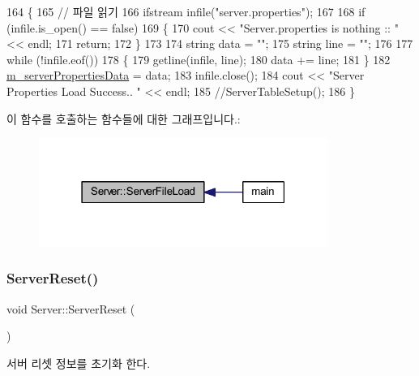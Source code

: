 \begin{DoxyCode}
164 \{
165     \textcolor{comment}{// 파일 읽기}
166     ifstream infile(\textcolor{stringliteral}{"server.properties"});
167 
168     \textcolor{keywordflow}{if} (infile.is\_open() == \textcolor{keyword}{false})
169     \{
170         cout << \textcolor{stringliteral}{"Server.properties is nothing :: "} << endl;
171         \textcolor{keywordflow}{return};
172     \}
173 
174     \textcolor{keywordtype}{string} data = \textcolor{stringliteral}{""};
175     \textcolor{keywordtype}{string} line = \textcolor{stringliteral}{""};
176 
177     \textcolor{keywordflow}{while} (!infile.eof())
178     \{
179         getline(infile, line);
180         data += line;
181     \}
182     \hyperlink{class_server_ae4a69c37027fd029b43099469ae00ad8}{m\_serverPropertiesData} = data;
183     infile.close();
184     cout << \textcolor{stringliteral}{"Server Properties Load Success.. "} << endl;
185     \textcolor{comment}{//ServerTableSetup();}
186 \}
\end{DoxyCode}
이 함수를 호출하는 함수들에 대한 그래프입니다.\+:\nopagebreak
\begin{figure}[H]
\begin{center}
\leavevmode
\includegraphics[width=267pt]{class_server_abfc09109c7050e40d8fc1e3daea76edf_icgraph}
\end{center}
\end{figure}
\mbox{\label{class_server_a88d53d3c77d90f211f3ca7cc51735171}} 
\subsubsection{\texorpdfstring{Server\+Reset()}{ServerReset()}}
{\footnotesize\ttfamily void Server\+::\+Server\+Reset (\begin{DoxyParamCaption}{ }\end{DoxyParamCaption})}



서버 리셋 정보를 초기화 한다. 

